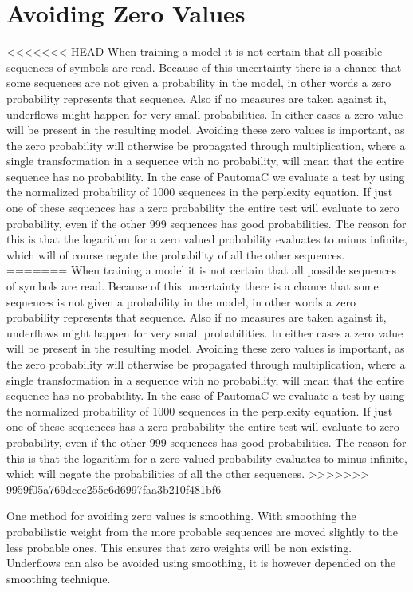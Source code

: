 \section{Avoiding Zero Values}

<<<<<<< HEAD
When training a model it is not certain that all possible sequences of symbols are read. Because of this uncertainty there is a chance that some sequences are not given a probability in the model, in other words a zero probability represents that sequence. Also if no measures are taken against it, underflows might happen for very small probabilities. In either cases a zero value will be present in the resulting model. Avoiding these zero values is important, as the zero probability will otherwise be propagated through multiplication, where a single transformation in a sequence with no probability, will mean that the entire sequence has no probability. In the case of PautomaC we evaluate a test by using the normalized probability of 1000 sequences in the perplexity equation. If just one of these sequences has a zero probability the entire test will evaluate to zero probability, even if the other 999 sequences has good probabilities. The reason for this is that the logarithm for a zero valued probability evaluates to minus infinite, which will of course negate the probability of all the other sequences.
=======
When training a model it is not certain that all possible sequences of symbols are read. Because of this uncertainty there is a chance that some sequences is not given a probability in the model, in other words a zero probability represents that sequence. Also if no measures are taken against it, underflows might happen for very small probabilities. In either cases a zero value will be present in the resulting model. Avoiding these zero values is important, as the zero probability will otherwise be propagated through multiplication, where a single transformation in a sequence with no probability, will mean that the entire sequence has no probability. In the case of PautomaC we evaluate a test by using the normalized probability of 1000 sequences in the perplexity equation. If just one of these sequences has a zero probability the entire test will evaluate to zero probability, even if the other 999 sequences has good probabilities. The reason for this is that the logarithm for a zero valued probability evaluates to minus infinite, which will negate the probabilities of all the other sequences.
>>>>>>> 9959f05a769dcce255e6d6997faa3b210f481bf6


One method for avoiding zero values is smoothing. With smoothing the probabilistic weight from the more probable sequences are moved slightly to the less probable ones. This ensures that zero weights will be non existing. Underflows can also be avoided using smoothing, it is however depended on the smoothing technique.


